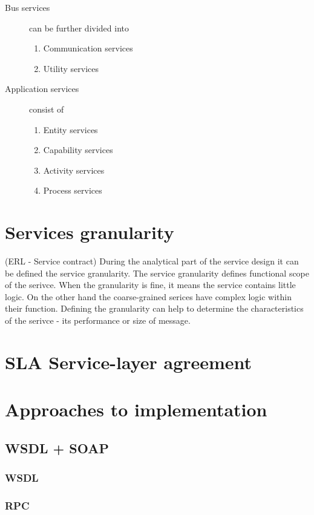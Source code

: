 \begin{description}
  \item[Bus services] can be further divided into 
  \begin{enumerate}
    \item Communication services
    \item Utility services
  \end{enumerate}
  \item[Application services] consist of   
  \begin{enumerate}
    \item Entity services
    \item Capability services
    \item Activity services
    \item Process services
  \end{enumerate}
\end{description}

\section{Services granularity}  (ERL - Service contract)
During the analytical part of the service design it can be defined the service granularity. The service granularity defines functional scope of the serivce. When the granularity is fine, it means the service contains little logic. On the other hand the coarse-grained serices have complex logic within their function.
Defining the granularity can help to determine the characteristics of the serivce - its performance or size of message. 

\section{SLA Service-layer agreement}
\label{sec:sla}

\section{Approaches to implementation}

\subsection{WSDL + SOAP}
\subsubsection{WSDL}
\subsubsection{RPC}
